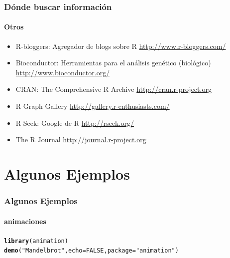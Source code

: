 \documentclass{beamer}\usepackage{graphicx, color}
\makeatletter
\newcommand{\hlfunctioncall}[1]{\textcolor[rgb]{0.501960784313725,0,0.329411764705882}{\textbf{#1}}}%
\newcommand{\hlstring}[1]{\textcolor[rgb]{0.6,0.6,1}{#1}}%
\newenvironment{kframe}{%
 \def\at@end@of@kframe{}%
 \ifinner\ifhmode%
  \def\at@end@of@kframe{\end{minipage}}%
  \begin{minipage}{\columnwidth}%
 \fi\fi%
 \def\FrameCommand##1{\hskip\@totalleftmargin \hskip-\fboxsep
 \colorbox{shadecolor}{##1}\hskip-\fboxsep
     \hskip-\linewidth \hskip-\@totalleftmargin \hskip\columnwidth}%
 \MakeFramed {\advance\hsize-\width
   \@totalleftmargin\z@ \linewidth\hsize
   \@setminipage}}%
 {\par\unskip\endMakeFramed%
 \at@end@of@kframe}
\newenvironment{knitrout}{}{} %
\makeatother
\begin{document}
\begin{frame}
\frametitle{D\'onde buscar informaci\'on}
\framesubtitle{Otros}
\begin{itemize}[<+->]
\item R-bloggers: Agregador de blogs sobre R \url{http://www.r-bloggers.com/}
\item Bioconductor: Herramientas para el an\'alisis gen\'etico (biol\'ogico) \url{http://www.bioconductor.org/}
\item CRAN: The Comprehensive R Archive \url{http://cran.r-project.org}
\item R Graph Gallery \url{http://gallery.r-enthusiasts.com/}
\item R Seek: Google de R \url{http://rseek.org/}
\item The R Journal \url{http://journal.r-project.org}
\end{itemize}
\end{frame}

\section{Algunos Ejemplos}

\begin{frame}[fragile]
\frametitle{Algunos Ejemplos}
\framesubtitle{animaciones}
\begin{knitrout}
\color{fgcolor}\begin{kframe}
\begin{alltt}
\hlfunctioncall{library}(animation)
\hlfunctioncall{demo}(\hlstring{"Mandelbrot"}, echo = FALSE, package = \hlstring{"animation"})
\end{alltt}
\end{kframe}




















\end{knitrout}

\end{frame}
\end{document}
